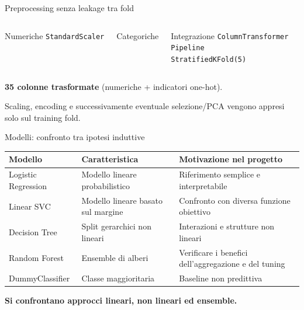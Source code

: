 \documentclass[10pt,aspectratio=169]{beamer}
\newcommand{\keypoint}[1]{\par\vspace{0.45em}\noindent{\color{teal}\rule{2.4pt}{1.25em}}\hspace{0.7em}\parbox[t]{0.92\linewidth}{\raggedright\textbf{#1}}}
\begin{document}
\begin{frame}{Preprocessing senza leakage tra fold}
\begin{columns}[T,onlytextwidth]
\begin{block}{Numeriche}
\centering \texttt{StandardScaler}
\end{block}
\begin{block}{Categoriche}
\end{block}
\begin{block}{Integrazione}
\centering \texttt{ColumnTransformer}\\\medskip
\texttt{Pipeline}\\\medskip
\texttt{StratifiedKFold(5)}
\end{block}
\end{columns}
\vspace{.6em}
\centering\textbf{35 colonne trasformate} (numeriche + indicatori one-hot).\par
\vspace{.45em}
{\small Scaling, encoding e successivamente eventuale selezione/PCA vengono appresi solo sul training fold.}
\end{frame}

\begin{frame}{Modelli: confronto tra ipotesi induttive}
\small
\begin{tabularx}{\linewidth}{@{}p{.24\linewidth}X X@{}}\toprule
\textbf{Modello} & \textbf{Caratteristica} & \textbf{Motivazione nel progetto}\\\midrule
Logistic Regression & Modello lineare probabilistico & Riferimento semplice e interpretabile\\
Linear SVC & Modello lineare basato sul margine & Confronto con diversa funzione obiettivo\\
Decision Tree & Split gerarchici non lineari & Interazioni e strutture non lineari\\
Random Forest & Ensemble di alberi & Verificare i benefici dell'aggregazione e del tuning\\
DummyClassifier & Classe maggioritaria & Baseline non predittiva\\\bottomrule\end{tabularx}
\vspace{.7em}
\keypoint{Si confrontano approcci lineari, non lineari ed ensemble.}
\end{frame}
\end{document}
